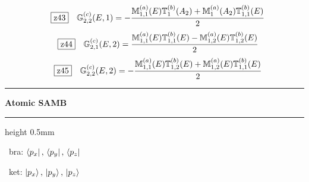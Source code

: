 \documentclass[fleqn,10pt,landscape]{jsarticle}
\begin{document}
\begin{dmath*}
\hspace*{3mm}\fbox{z43}\quad \mathbb{G}_{2,2}^{(c)}(E,1)=- \frac{\mathbb{M}_{1,1}^{(a)}(E) \mathbb{T}_{1}^{(b)}(A_{2}) + \mathbb{M}_{1}^{(a)}(A_{2}) \mathbb{T}_{1,1}^{(b)}(E)}{2}
\end{dmath*}
\begin{dmath*}
\hspace*{3mm}\fbox{z44}\quad \mathbb{G}_{2,1}^{(c)}(E,2)=\frac{\mathbb{M}_{1,1}^{(a)}(E) \mathbb{T}_{1,1}^{(b)}(E) - \mathbb{M}_{1,2}^{(a)}(E) \mathbb{T}_{1,2}^{(b)}(E)}{2}
\end{dmath*}
\begin{dmath*}
\hspace*{3mm}\fbox{z45}\quad \mathbb{G}_{2,2}^{(c)}(E,2)=- \frac{\mathbb{M}_{1,1}^{(a)}(E) \mathbb{T}_{1,2}^{(b)}(E) + \mathbb{M}_{1,2}^{(a)}(E) \mathbb{T}_{1,1}^{(b)}(E)}{2}
\end{dmath*}
\vspace{5mm}

\vspace{5mm}
\noindent \rule[0.5mm]{5mm}{0.5mm}\hspace{3mm}\textbf{Atomic SAMB}\hspace{3mm}\leaders\hrule height 0.5mm\hfill\kern0pt
\vspace{3mm}

\vspace{5mm}

\noindent\textbullet\, bra: $\bra{p_{x}},\, \bra{p_{y}},\, \bra{p_{z}}$

\noindent\textbullet\, ket: $\ket{p_{x}},\, \ket{p_{y}},\, \ket{p_{z}}$
\end{document}
